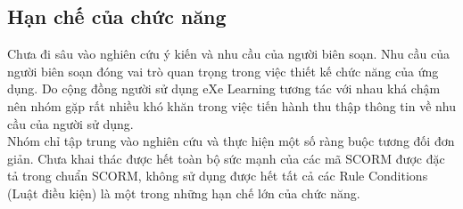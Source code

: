 \subsection{Hạn chế của chức năng}	

	Chưa đi sâu vào nghiên cứu ý kiến và nhu cầu của người biên soạn. Nhu cầu của người biên soạn đóng vai trò quan trọng trong việc thiết kế chức năng của ứng dụng. Do cộng đồng người sử dụng eXe Learning tương tác với nhau khá chậm nên nhóm gặp rất nhiều khó khăn trong việc tiến hành thu thập thông tin về nhu cầu của người sử dụng. \\
	
	Nhóm chỉ tập trung vào nghiên cứu và thực hiện một số ràng buộc tương đối đơn giản.  Chưa khai thác được hết toàn bộ sức mạnh của các mã SCORM được đặc tả trong chuẩn SCORM, không sử dụng được hết tất cả các Rule Conditions (Luật điều kiện) là một trong những hạn chế lớn của chức năng.








